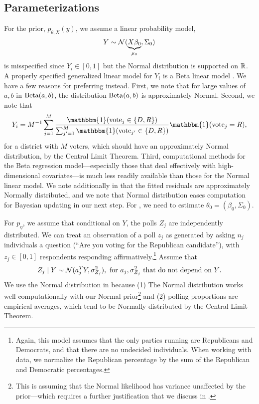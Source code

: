 \documentclass[11pt]{article}
\begin{document}
\subsection{Parameterizations}

For the prior, $p_{\theta, X}(y)$, we assume a linear probability model,
\begin{equation}
    Y \sim \mathcal{N}(\underbrace{X\beta_0}_{\mu_0}, \Sigma_0)
    \label{eq:first_stage}
\end{equation}
 is misspecified since $Y_i \in [0,1]$ but the Normal
distribution is supported on $\mathbb{R}$. A properly specified generalized linear model
for $Y_i$ is a Beta linear model \citep[See][for an overview]{grun2011extended}.
We have a few reasons for preferring  instead. First, we
note that for large values of $a,b$ in $\operatorname{Beta}(a,b)$, the distribution
$\operatorname{Beta}(a,b)$ is approximately Normal. Second, we note that \[Y_i = M^{-1}
\sum_{j=1}^M \frac{\mathbbm{1} (\text{vote}_j \in \{D,R\})}{\sum_{j'=1}^M \mathbbm{1}
(\text{vote}_{j'} \in \{D,R\})} \mathbbm{1}(\text{vote}_j = R),\] for a district with
$M$ voters, which should have an approximately Normal distribution, by the
Central Limit Theorem. Third, computational methods for the Beta regression
model---especially those that deal effectively with high-dimensional
covariates---is much less readily available than those for the Normal linear
model. We note additionally in  that the fitted residuals are
approximately Normally distributed, and we note that Normal distribution eases
computation for Bayesian updating in our next step. For ,
we need to estimate $\theta_0 = (\beta_0, \Sigma_0)$. 

For $p_{\eta}$, we assume that conditional on $Y$, the polls $Z_j$ are
independently distributed. We can treat an observation of a poll $z_j$ as
generated by
asking $n_j$
individuals a question (``Are you voting for the Republican candidate''), with
$z_j \in [0,1]$ respondents responding
affirmatively.\footnote{Again, this model assumes that the only parties running
are Republicans and Democrats, and that there are no undecided individuals.
When working with data, we normalize the Republican percentage by the sum of
the Republican and Democratic percentages.}
Assume that 
\begin{equation}
    Z_j \mid Y \sim \mathcal{N}(a_j^T Y, \sigma_{Z_j}^2), \text{ for $a_j, \sigma_
    {Z_j}^2$ that do not depend on $Y$}.
    \label{eq:polls}
\end{equation}
We use the Normal distribution in  because (1) The Normal
distribution works well computationally with our Normal prior\footnote{This is
assuming that the Normal likelihood has variance unaffected by the
prior---which requires a further justification that we discuss in 
.} and (2) polling proportions are empirical averages, which
tend to be Normally distributed by the Central Limit Theorem.
\end{document}
